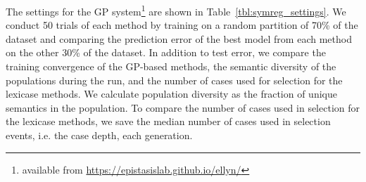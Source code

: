 \documentclass[twoside]{article}
\begin{document}
The settings for the GP system\footnote{available from \url{https://epistasislab.github.io/ellyn/}} are shown in Table~\ref{tbl:symreg_settings}. We conduct 50 trials of each method by training on a random partition of 70\% of the dataset and comparing the prediction error of the best model from each method on the other 30\% of the dataset. In addition to test error, we compare the training convergence of the GP-based methods, the semantic diversity of the populations during the run, and the number of cases used for selection for the lexicase methods. We calculate population diversity as the fraction of unique semantics in the population. To compare the number of cases used in selection for the lexicase methods, we save the median number of cases used in selection events, i.e. the case depth, each generation. 

\end{document}
